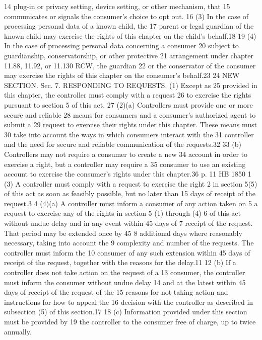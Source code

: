 14 plug-in or privacy setting, device setting, or other mechanism, that
15 communicates or signals the consumer's choice to opt out.
16 (3) In the case of processing personal data of a known child, the
17 parent or legal guardian of the known child may exercise the rights
of this chapter on the child's behalf.18
19 (4) In the case of processing personal data concerning a consumer
20 subject to guardianship, conservatorship, or other protective
21 arrangement under chapter 11.88, 11.92, or 11.130 RCW, the guardian
22 or the conservator of the consumer may exercise the rights of this
chapter on the consumer's behalf.23
24 NEW SECTION. Sec. 7. RESPONDING TO REQUESTS. (1) Except as
25 provided in this chapter, the controller must comply with a request
26 to exercise the rights pursuant to section 5 of this act.
27 (2)(a) Controllers must provide one or more secure and reliable
28 means for consumers and a consumer's authorized agent to submit a
29 request to exercise their rights under this chapter. These means must
30 take into account the ways in which consumers interact with the
31 controller and the need for secure and reliable communication of the
requests.32
33 (b) Controllers may not require a consumer to create a new
34 account in order to exercise a right, but a controller may require a
35 consumer to use an existing account to exercise the consumer's rights
under this chapter.36
p. 11 HB 1850
1 (3) A controller must comply with a request to exercise the right
2 in section 5(5) of this act as soon as feasibly possible, but no
later than 15 days of receipt of the request.3
4 (4)(a) A controller must inform a consumer of any action taken on
5 a request to exercise any of the rights in section 5 (1) through (4)
6 of this act without undue delay and in any event within 45 days of
7 receipt of the request. That period may be extended once by 45
8 additional days where reasonably necessary, taking into account the
9 complexity and number of the requests. The controller must inform the
10 consumer of any such extension within 45 days of receipt of the
request, together with the reasons for the delay.11
12 (b) If a controller does not take action on the request of a
13 consumer, the controller must inform the consumer without undue delay
14 and at the latest within 45 days of receipt of the request of the
15 reasons for not taking action and instructions for how to appeal the
16 decision with the controller as described in subsection (5) of this
section.17
18 (c) Information provided under this section must be provided by
19 the controller to the consumer free of charge, up to twice annually.
